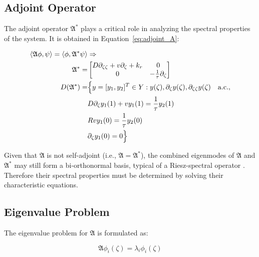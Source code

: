 \subsection{Adjoint Operator}

The adjoint operator $\mathfrak{A}^*$ plays a critical role in analyzing the spectral properties of the system. It is obtained in Equation~\ref{eq:adjoint_A}:

\begin{equation} \label{eq:adjoint_A}
    \begin{aligned}
        \langle \mathfrak{A} \phi, \psi\rangle  = \langle \phi, {\mathfrak{A}}^{*} \psi\rangle  &\Rightarrow \\
        {\mathfrak{A}}^{*} =&
        \begin{bmatrix}
            D \partial_{\zeta \zeta} + v \partial_\zeta +k_r & 0\\
            0 & -\frac{1}{\tau} \partial_\zeta
        \end{bmatrix}\\
        D(\mathfrak{A}^*) =& \Bigl\{ y = [y_1, y_2]^T \in Y:
        y(\zeta), \partial_\zeta y(\zeta), \partial_{\zeta \zeta} y(\zeta) \quad \mathrm{a.c.},\\
        &D \partial_\zeta y_1(1) + v y_1(1) = \frac{1}{\tau} y_2(1) \\
        &R v y_1(0) = \frac{1}{\tau} y_2(0) \\
        &\partial_\zeta y_1(0) = 0 \Bigr\}
    \end{aligned}
\end{equation}

Given that $\mathfrak{A}$ is not self-adjoint (i.e., $\mathfrak{A} = \mathfrak{A}^*$), the combined eigenmodes of $\mathfrak{A}$ and $\mathfrak{A}^*$ may still form a bi-orthonormal basis, typical of a Riesz-spectral operator \autocite{curtainbook}. Therefore their spectral properties must be determined by solving their characteristic equations.

\subsection{Eigenvalue Problem}

The eigenvalue problem\autocite{pdebook} for $\mathfrak{A}$ is formulated as:

\begin{equation} \label{eq:eig_prob}
        \mathfrak{A} \phi_i(\zeta) = \lambda_i \phi_i(\zeta)
\end{equation}


